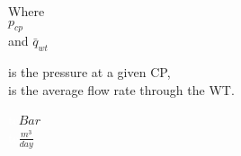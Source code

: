 \begin{minipage}[t]{0.20\textwidth}

Where\\
\hspace*{8mm} $p_{cp}$ \\
and \hspace*{0.7mm} $\bar{q}_{wt}$	
\end{minipage}
\begin{minipage}[t]{0.68\textwidth}
\vspace*{2mm}
is the pressure at a given CP,\\
is the average flow rate through the WT.
\end{minipage}
\begin{minipage}[t]{0.10\textwidth}
\vspace*{2mm}
\textcolor{White}{te}$\unit{Bar}$\\
\textcolor{White}{te}$\unit{\frac{m^3}{day}}$
\end{minipage}